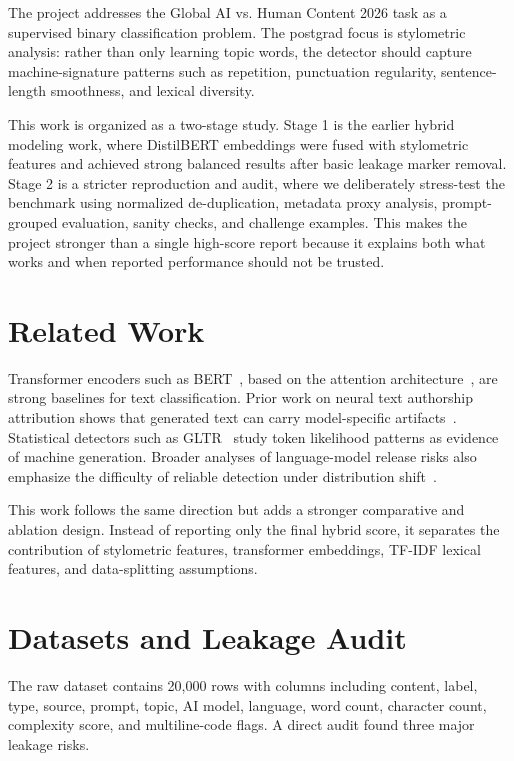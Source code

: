 \documentclass[conference]{IEEEtran}
\begin{document}
The project addresses the Global AI vs. Human Content 2026 task as a supervised binary classification problem. The postgrad focus is stylometric analysis: rather than only learning topic words, the detector should capture machine-signature patterns such as repetition, punctuation regularity, sentence-length smoothness, and lexical diversity.

This work is organized as a two-stage study. Stage 1 is the earlier hybrid modeling work, where DistilBERT embeddings were fused with stylometric features and achieved strong balanced results after basic leakage marker removal. Stage 2 is a stricter reproduction and audit, where we deliberately stress-test the benchmark using normalized de-duplication, metadata proxy analysis, prompt-grouped evaluation, sanity checks, and challenge examples. This makes the project stronger than a single high-score report because it explains both what works and when reported performance should not be trusted.

\section{Related Work}
Transformer encoders such as BERT~\cite{devlin2019bert}, based on the attention architecture~\cite{vaswani2017attention}, are strong baselines for text classification. Prior work on neural text authorship attribution shows that generated text can carry model-specific artifacts~\cite{uchendu2020authorship}. Statistical detectors such as GLTR~\cite{gehrmann2019gltr} study token likelihood patterns as evidence of machine generation. Broader analyses of language-model release risks also emphasize the difficulty of reliable detection under distribution shift~\cite{solaiman2019release,pan2024llmdetect}.

This work follows the same direction but adds a stronger comparative and ablation design. Instead of reporting only the final hybrid score, it separates the contribution of stylometric features, transformer embeddings, TF-IDF lexical features, and data-splitting assumptions.

\section{Datasets and Leakage Audit}
The raw dataset contains 20,000 rows with columns including content, label, type, source, prompt, topic, AI model, language, word count, character count, complexity score, and multiline-code flags. A direct audit found three major leakage risks.
\end{document}
